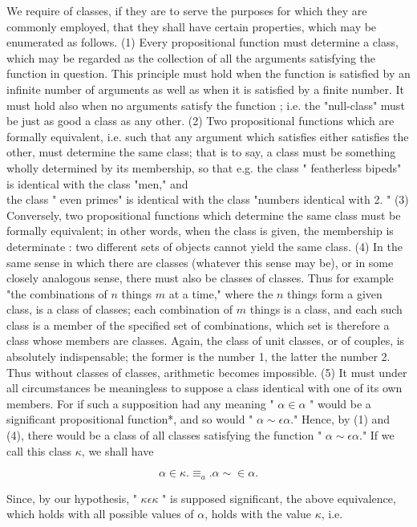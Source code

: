 \documentclass[10pt]{article}
\begin{document}
We require of classes, if they are to serve the purposes for which they are commonly employed, that they shall have certain properties, which may be enumerated as follows. (1) Every propositional function must determine a class, which may be regarded as the collection of all the arguments satisfying the function in question. This principle must hold when the function is satisfied by an infinite number of arguments as well as when it is satisfied by a finite number. It must hold also when no arguments satisfy the function ; i.e. the "null-class" must be just as good a class as any other. (2) Two propositional functions which are formally equivalent, i.e. such that any argument which satisfies either satisfies the other, must determine the same class; that is to say, a class must be something wholly determined by its membership, so that e.g. the class " featherless bipeds" is identical with the class "men," and\\
the class " even primes" is identical with the class "numbers identical with 2. " (3) Conversely, two propositional functions which determine the same class must be formally equivalent; in other words, when the class is given, the membership is determinate : two different sets of objects cannot yield the same class. (4) In the same sense in which there are classes (whatever this sense may be), or in some closely analogous sense, there must also be classes of classes. Thus for example "the combinations of $n$ things $m$ at a time," where the $n$ things form a given class, is a class of classes; each combination of $m$ things is a class, and each such class is a member of the specified set of combinations, which set is therefore a class whose members are classes. Again, the class of unit classes, or of couples, is absolutely indispensable; the former is the number 1, the latter the number 2. Thus without classes of classes, arithmetic becomes impossible. (5) It must under all circumstances be meaningless to suppose a class identical with one of its own members. For if such a supposition had any meaning " $\alpha \in \alpha$ " would be a significant propositional function*, and so would " $\alpha \sim \epsilon \alpha$." Hence, by (1) and (4), there would be a class of all classes satisfying the function " $\alpha \sim \epsilon \alpha$." If we call this class $\kappa$, we shall have

$$
\alpha \in \kappa . \equiv_{a} . \alpha \sim \in \alpha .
$$

Since, by our hypothesis, " $\kappa \epsilon \kappa$ " is supposed significant, the above equivalence, which holds with all possible values of $\alpha$, holds with the value $\kappa$, i.e.
\end{document}
